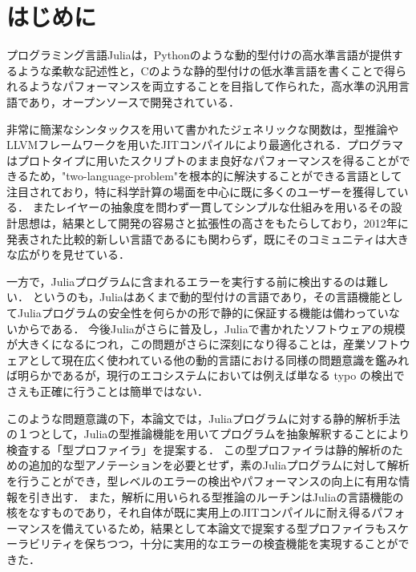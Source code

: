 
\section{はじめに}

プログラミング言語Juliaは，Pythonのような動的型付けの高水準言語が提供するような柔軟な記述性と，Cのような静的型付けの低水準言語を書くことで得られるようなパフォーマンスを両立することを目指して作られた，高水準の汎用言語であり，オープンソースで開発されている．

非常に簡潔なシンタックスを用いて書かれたジェネリックな関数は，型推論やLLVMフレームワークを用いたJITコンパイルにより最適化される．プログラマはプロトタイプに用いたスクリプトのまま良好なパフォーマンスを得ることができるため，"two-language-problem"\footnotemark を根本的に解決することができる言語として注目されており，特に科学計算の場面を中心に既に多くのユーザーを獲得している．
またレイヤーの抽象度を問わず一貫してシンプルな仕組みを用いるその設計思想は，結果として開発の容易さと拡張性の高さをもたらしており，2012年に発表された比較的新しい言語であるにも関わらず，既にそのコミュニティは大きな広がりを見せている．


一方で，Juliaプログラムに含まれるエラーを実行する前に検出するのは難しい．
というのも，Juliaはあくまで動的型付けの言語であり，その言語機能としてJuliaプログラムの安全性を何らかの形で静的に保証する機能は備わっていないからである．
今後Juliaがさらに普及し，Juliaで書かれたソフトウェアの規模が大きくになるにつれ，この問題がさらに深刻になり得ることは，産業ソフトウェアとして現在広く使われている他の動的言語における同様の問題意識を鑑みれば明らかであるが\cite{ruby-progress-report}，現行のエコシステムにおいては例えば単なる typo の検出でさえも正確に行うことは簡単ではない．

このような問題意識の下，本論文では，Juliaプログラムに対する静的解析手法の１つとして，Juliaの型推論機能を用いてプログラムを抽象解釈することにより検査する「型プロファイラ」を提案する．
この型プロファイラは静的解析のための追加的な型アノテーションを必要とせず，素のJuliaプログラムに対して解析を行うことができ，型レベルのエラーの検出やパフォーマンスの向上に有用な情報を引き出す．
また，解析に用いられる型推論のルーチンはJuliaの言語機能の核をなすものであり，それ自体が既に実用上のJITコンパイルに耐え得るパフォーマンスを備えているため，結果として本論文で提案する型プロファイラもスケーラビリティを保ちつつ，十分に実用的なエラーの検査機能を実現することができた．

